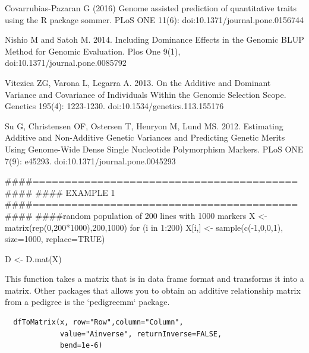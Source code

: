\documentclass[a4paper]{book}
\begin{document}
\begin{References}\relax

Covarrubias-Pazaran G (2016) Genome assisted prediction of quantitative traits using the R package sommer. PLoS ONE 11(6): doi:10.1371/journal.pone.0156744 

Nishio M and Satoh M. 2014. Including Dominance Effects in the Genomic BLUP Method for Genomic Evaluation. Plos One 9(1), doi:10.1371/journal.pone.0085792

Vitezica ZG, Varona L, Legarra A. 2013. On the Additive and Dominant Variance and Covariance of Individuals Within the Genomic Selection Scope. Genetics 195(4): 1223-1230. doi:10.1534/genetics.113.155176

Su G, Christensen OF, Ostersen T, Henryon M, Lund MS. 2012. Estimating Additive and Non-Additive Genetic Variances and Predicting Genetic Merits Using Genome-Wide Dense Single Nucleotide Polymorphism Markers. PLoS ONE 7(9): e45293. doi:10.1371/journal.pone.0045293

\end{References}
%
\begin{Examples}
\begin{ExampleCode}
####=========================================####
#### EXAMPLE 1
####=========================================####
####random population of 200 lines with 1000 markers
X <- matrix(rep(0,200*1000),200,1000)
for (i in 1:200) {
  X[i,] <- sample(c(-1,0,0,1), size=1000, replace=TRUE)
}

D <- D.mat(X)

\end{ExampleCode}
\end{Examples}
%
\begin{Description}\relax
This function takes a matrix that is in data frame format and transforms it into a matrix. Other packages that allows you to obtain an additive relationship matrix from a pedigree is the `pedigreemm` package.
\end{Description}
%
\begin{Usage}
\begin{verbatim}
  dfToMatrix(x, row="Row",column="Column",
             value="Ainverse", returnInverse=FALSE, 
             bend=1e-6)
\end{verbatim}
\end{Usage}
%
\end{document}
